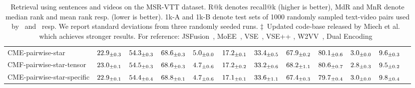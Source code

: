 \begin{table*}[t]
\begin{tabular}{l | c | c c c c c |@{\hskip -0.2cm}c@{\hskip -0.35cm}c@{\hskip -0.35cm}c@{\hskip -0.1cm}c@{\hskip -0.2cm}c}
CME-pairwise-star & $ 22.9_{\pm0.3}$ & $ 54.3_{\pm0.3}$ & $ 68.6_{\pm0.3}$ & $ 5.0_{\pm0.0}$ & $ 17.2_{\pm0.1}$ & $ 33.4_{\pm0.5}$ & $ 67.9_{\pm0.2}$ & $ 80.1_{\pm0.6}$ & $ 3.0_{\pm0.0}$ & $ 9.6_{\pm0.3}$ \\
CMF-pairwise-star-tensor & $ 23.0_{\pm0.1}$ & $ 54.5_{\pm0.3}$ & $ 68.6_{\pm0.3}$ & $ 4.7_{\pm0.6}$ & $ 17.2_{\pm0.2}$ & $ 33.2_{\pm0.6}$ & $ 68.2_{\pm1.1}$ & $ 80.6_{\pm0.7}$ & $ 2.8_{\pm0.3}$ & $ 9.5_{\pm0.2}$ \\
CME-pairwise-star-specific & $ 22.9_{\pm0.1}$ & $ 54.4_{\pm0.4}$ & $ 68.8_{\pm0.1}$ & $ 4.7_{\pm0.6}$ & $ 17.1_{\pm0.1}$ & $ 33.6_{\pm1.1}$ & $ 67.4_{\pm0.3}$ & $ 79.7_{\pm0.4}$ & $ 3.0_{\pm0.0}$ & $ 9.8_{\pm0.4}$ \\
\hline \hline
\end{tabular}
\vspace{0.2cm}
\caption{\color{red}Retrieval using sentences and videos on the MSR-VTT dataset. R$@$k denotes recall$@$k (higher is better), MdR and MnR denote median rank and mean rank resp. (lower is better). 1k-A and 1k-B denote test sets of 1000 randomly sampled text-video pairs used by~\cite{yu2018joint} and~\cite{miech2018learning} resp.  We report standard deviations from three randomly seeded runs.  $\ddagger$~Updated code-base released by Miech et al.~\cite{miech2018learning} which achieves stronger results. For reference: JSFusion~\cite{yu2018joint}, MoEE~\cite{miech2018learning}, VSE~\cite{mithun2018learning}, VSE++ \cite{mithun2018learning}, W2VV~\cite{dong2018predicting}, Dual Encoding~\cite{dong2018dual} \color{black}}
\label{table:MSRVTT} 
\end{table*}

\normalsize